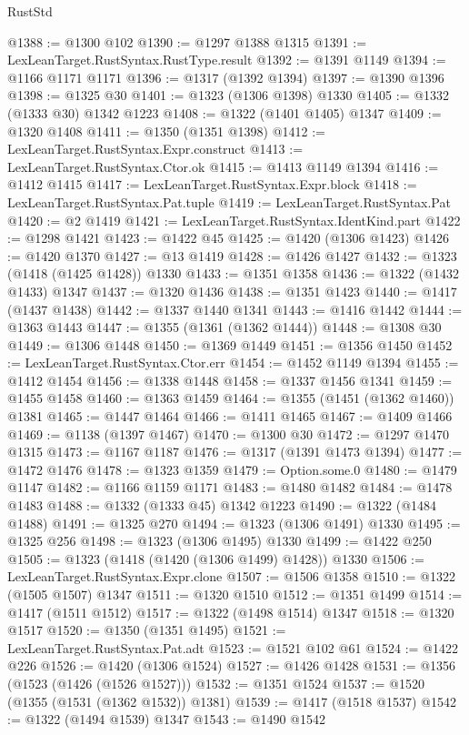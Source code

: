 \begin{lexlean}{RustStd}
\begin{coremodule}
@1388 := @1300 @102
@1390 := @1297 @1388 @1315
@1391 := LexLeanTarget.RustSyntax.RustType.result
@1392 := @1391 @1149
@1394 := @1166 @1171 @1171
@1396 := @1317 (@1392 @1394)
@1397 := @1390 @1396
@1398 := @1325 @30
@1401 := @1323 (@1306 @1398) @1330
@1405 := @1332 (@1333 @30) @1342 @1223
@1408 := @1322 (@1401 @1405) @1347
@1409 := @1320 @1408
@1411 := @1350 (@1351 @1398)
@1412 := LexLeanTarget.RustSyntax.Expr.construct
@1413 := LexLeanTarget.RustSyntax.Ctor.ok
@1415 := @1413 @1149 @1394
@1416 := @1412 @1415
@1417 := LexLeanTarget.RustSyntax.Expr.block
@1418 := LexLeanTarget.RustSyntax.Pat.tuple
@1419 := LexLeanTarget.RustSyntax.Pat
@1420 := @2 @1419
@1421 := LexLeanTarget.RustSyntax.IdentKind.part
@1422 := @1298 @1421
@1423 := @1422 @45
@1425 := @1420 (@1306 @1423)
@1426 := @1420 @1370
@1427 := @13 @1419
@1428 := @1426 @1427
@1432 := @1323 (@1418 (@1425 @1428)) @1330
@1433 := @1351 @1358
@1436 := @1322 (@1432 @1433) @1347
@1437 := @1320 @1436
@1438 := @1351 @1423
@1440 := @1417 (@1437 @1438)
@1442 := @1337 @1440 @1341
@1443 := @1416 @1442
@1444 := @1363 @1443
@1447 := @1355 (@1361 (@1362 @1444))
@1448 := @1308 @30
@1449 := @1306 @1448
@1450 := @1369 @1449
@1451 := @1356 @1450
@1452 := LexLeanTarget.RustSyntax.Ctor.err
@1454 := @1452 @1149 @1394
@1455 := @1412 @1454
@1456 := @1338 @1448
@1458 := @1337 @1456 @1341
@1459 := @1455 @1458
@1460 := @1363 @1459
@1464 := @1355 (@1451 (@1362 @1460)) @1381
@1465 := @1447 @1464
@1466 := @1411 @1465
@1467 := @1409 @1466
@1469 := @1138 (@1397 @1467)
@1470 := @1300 @30
@1472 := @1297 @1470 @1315
@1473 := @1167 @1187
@1476 := @1317 (@1391 @1473 @1394)
@1477 := @1472 @1476
@1478 := @1323 @1359
@1479 := Option.some.{0}
@1480 := @1479 @1147
@1482 := @1166 @1159 @1171
@1483 := @1480 @1482
@1484 := @1478 @1483
@1488 := @1332 (@1333 @45) @1342 @1223
@1490 := @1322 (@1484 @1488)
@1491 := @1325 @270
@1494 := @1323 (@1306 @1491) @1330
@1495 := @1325 @256
@1498 := @1323 (@1306 @1495) @1330
@1499 := @1422 @250
@1505 := @1323 (@1418 (@1420 (@1306 @1499) @1428)) @1330
@1506 := LexLeanTarget.RustSyntax.Expr.clone
@1507 := @1506 @1358
@1510 := @1322 (@1505 @1507) @1347
@1511 := @1320 @1510
@1512 := @1351 @1499
@1514 := @1417 (@1511 @1512)
@1517 := @1322 (@1498 @1514) @1347
@1518 := @1320 @1517
@1520 := @1350 (@1351 @1495)
@1521 := LexLeanTarget.RustSyntax.Pat.adt
@1523 := @1521 @102 @61
@1524 := @1422 @226
@1526 := @1420 (@1306 @1524)
@1527 := @1426 @1428
@1531 := @1356 (@1523 (@1426 (@1526 @1527)))
@1532 := @1351 @1524
@1537 := @1520 (@1355 (@1531 (@1362 @1532)) @1381)
@1539 := @1417 (@1518 @1537)
@1542 := @1322 (@1494 @1539) @1347
@1543 := @1490 @1542

\end{coremodule}
\end{lexlean}

